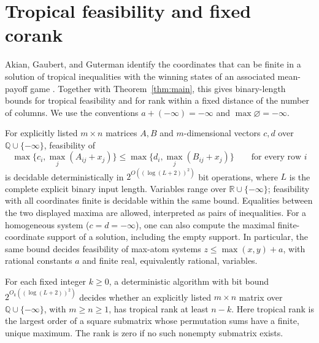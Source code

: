 \section{Tropical feasibility and fixed corank}
\label{sec:tropical}

Akian, Gaubert, and Guterman identify the coordinates that can be finite
in a solution of tropical inequalities with the winning states of an
associated mean-payoff game
\cite[Theorem~3.2 and Corollary~3.7]{AkianGaubertGuterman2012}.
Together with Theorem~\ref{thm:main}, this gives binary-length bounds
for tropical feasibility and for rank within a fixed distance of the
number of columns. We use the conventions $a+(-\infty)=-\infty$
and $\max\varnothing=-\infty$.

\begin{corollary}
\label{cor:tropical-computation}
For explicitly listed $m\times n$ matrices $A,B$ and $m$-dimensional
vectors $c,d$ over $\mathbb Q\cup\{-\infty\}$, feasibility of
\[
 \max\bigl\{c_i,\max_j(A_{ij}+x_j)\bigr\}
 \leq \max\bigl\{d_i,\max_j(B_{ij}+x_j)\bigr\}
 \qquad\text{for every row }i
\]
is decidable deterministically in
$2^{O((\log(L+2))^2)}$ bit operations, where $L$ is the complete
explicit binary input length. Variables range over
$\mathbb R\cup\{-\infty\}$; feasibility with all coordinates finite
is decidable within the same bound. Equalities between the two displayed
maxima are allowed, interpreted as pairs of inequalities.
For a homogeneous system ($c=d=-\infty$), one can also compute the
maximal finite-coordinate support of a solution, including the empty
support. In particular, the same bound decides feasibility of max-atom
systems $z\leq\max(x,y)+a$, with rational constants $a$ and finite
real, equivalently rational, variables.

For each fixed integer $k\geq0$, a deterministic algorithm with bit
bound $2^{O_k((\log(L+2))^2)}$ decides whether an explicitly listed
$m\times n$ matrix over $\mathbb Q\cup\{-\infty\}$, with $m\geq n\geq1$,
has tropical rank at least $n-k$. Here tropical rank is the largest
order of a square submatrix whose permutation sums have a finite,
unique maximum.
The rank is zero if no such nonempty submatrix exists.
\end{corollary}

